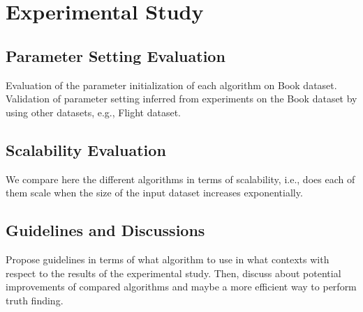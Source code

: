 \section{Experimental Study}

\subsection{Parameter Setting Evaluation}
Evaluation of the parameter initialization of each algorithm on Book dataset.
Validation of parameter setting inferred from experiments on the Book
dataset by using other datasets, e.g., Flight dataset. 

\subsection{Scalability Evaluation}
We compare here the different algorithms in terms of scalability, i.e., does each
of them scale when the size of the input dataset increases exponentially.

\subsection{Guidelines and Discussions}
Propose guidelines in terms of what algorithm to use in what contexts with respect to 
the results of the experimental study. Then, discuss about potential improvements of 
compared algorithms and maybe a more efficient way to perform truth finding.
